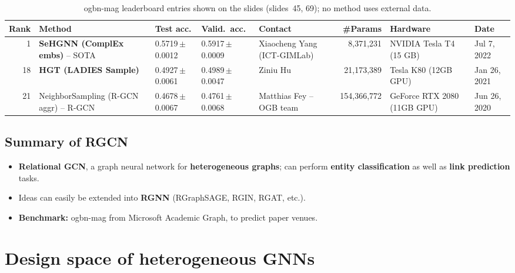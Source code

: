 \begin{table}[htbp]
  \centering\footnotesize
  \caption{ogbn-mag leaderboard entries shown on the slides (slides~45, 69); no
  method uses external data.}
  \label{tab:lec09-mag}
  \setlength{\tabcolsep}{3pt}
  \renewcommand{\arraystretch}{1.2}
  \begin{tabularx}{\textwidth}{@{}r>{\raggedright\arraybackslash}X ll
      >{\raggedright\arraybackslash}p{1.75cm}r>{\raggedright\arraybackslash}p{1.85cm}
      >{\raggedright\arraybackslash}p{1.15cm}@{}}
    \toprule
    Rank & Method & Test acc. & Valid.\ acc. & Contact & \#Params & Hardware & Date\\
    \midrule
    1 & \textbf{SeHGNN (ComplEx embs)} -- SOTA
      & 0.5719\,$\pm$\,0.0012 & 0.5917\,$\pm$\,0.0009
      & Xiaocheng Yang (ICT-GIMLab) & 8,371,231 & NVIDIA Tesla T4 (15 GB)
      & Jul 7, 2022\\
    18 & \textbf{HGT (LADIES Sample)}
      & 0.4927\,$\pm$\,0.0061 & 0.4989\,$\pm$\,0.0047
      & Ziniu Hu & 21,173,389 & Tesla K80 (12GB GPU) & Jan 26, 2021\\
    21 & NeighborSampling (R-GCN aggr) -- R-GCN
      & 0.4678\,$\pm$\,0.0067 & 0.4761\,$\pm$\,0.0068
      & Matthias Fey -- OGB team & 154,366,772 & GeForce RTX 2080 (11GB GPU)
      & Jun 26, 2020\\
    \bottomrule
  \end{tabularx}
\end{table}

\subsection{Summary of RGCN}\label{sec:lec09-rgcnsum}

\begin{itemize}
  \item \textbf{Relational GCN}, a graph neural network for \textbf{heterogeneous
    graphs}; can perform \textbf{entity classification} as well as \textbf{link
    prediction} tasks.
  \item Ideas can easily be extended into \textbf{RGNN} (RGraphSAGE, RGIN, RGAT,
    etc.).
  \item \textbf{Benchmark:} ogbn-mag from Microsoft Academic Graph, to predict
    paper venues.
\end{itemize}

\section{Design space of heterogeneous GNNs}\label{sec:lec09-design}

